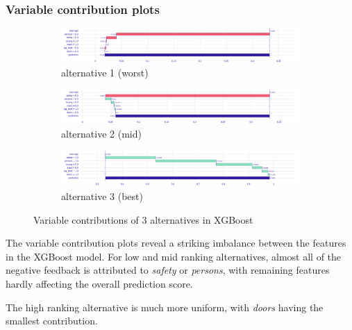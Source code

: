 \documentclass[../main.tex]{subfiles}
\begin{document}
\subsubsection{Variable contribution plots}
\begin{figure}[H]
	\centering
	\begin{subfigure}{\linewidth}
		\includegraphics[width=\linewidth]{../img/xgb-breakdown-worst.png}
		\caption{alternative 1 (worst)}
		\label{fig:xgb-3alt1-contrib}
	\end{subfigure}
	\begin{subfigure}{\linewidth}
		\includegraphics[width=\linewidth]{../img/xgb-breakdown-mid.png}
		\caption{alternative 2 (mid)}
		\label{fig:xgb-3alt2-contrib}
	\end{subfigure}
	\begin{subfigure}{\linewidth}
		\includegraphics[width=\linewidth]{../img/xgb-breakdown-best.png}
		\caption{alternative 3 (best)}
		\label{fig:xgb-3alt3-contrib}
	\end{subfigure}
	\caption{Variable contributions of 3 alternatives in XGBoost}
	\label{fig:xg-3alt-allcontrib}
\end{figure}
The variable contribution plots reveal a striking imbalance between the
features in the XGBoost model. For low and mid ranking alternatives, almost all
of the negative feedback is attributed to \emph{safety} or \emph{persons}, with
remaining features hardly affecting the overall prediction score.

The high ranking alternative is much more uniform, with \emph{doors} having the
smallest contribution.
\end{document}
